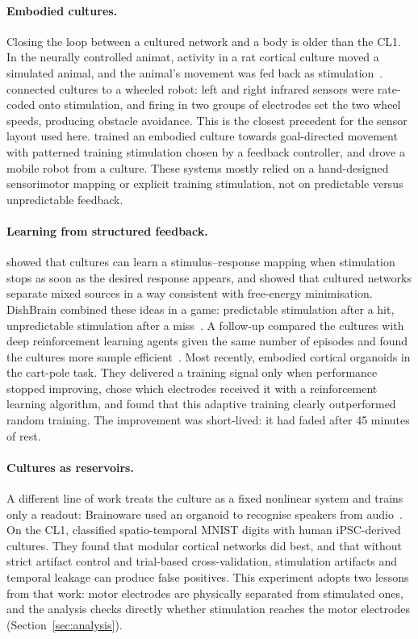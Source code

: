 \documentclass[11pt,a4paper]{article}
\begin{document}
\paragraph{Embodied cultures.} Closing the loop between a cultured network and a body is older
than the CL1. In the neurally controlled animat, activity in a rat cortical culture moved a
simulated animal, and the animal's movement was fed back as stimulation~\citep{demarse2001animat}.
\citet{novellino2007robot} connected cultures to a wheeled robot: left and right infrared sensors
were rate-coded onto stimulation, and firing in two groups of electrodes set the two wheel speeds,
producing obstacle avoidance. This is the closest precedent for the sensor layout used here.
\citet{chao2008shaping} trained an embodied culture towards goal-directed movement with
patterned training stimulation chosen by a feedback controller, and \citet{warwick2010robot} drove
a mobile robot from a culture. These systems mostly relied on a hand-designed sensorimotor
mapping or explicit training stimulation, not on predictable versus unpredictable feedback.

\paragraph{Learning from structured feedback.} \citet{shahaf2001learning} showed that cultures
can learn a stimulus--response mapping when stimulation stops as soon as the desired response
appears, and \citet{isomura2015bss} showed that cultured networks separate mixed sources in a way
consistent with free-energy minimisation. DishBrain combined these ideas in a game: predictable
stimulation after a hit, unpredictable stimulation after a miss~\citep{kagan2022dishbrain}. A
follow-up compared the cultures with deep reinforcement learning agents given the same number of
episodes and found the cultures more sample efficient~\citep{khajehnejad2024sample}. Most
recently, \citet{robbins2026organoids} embodied cortical organoids in the cart-pole task. They
delivered a training signal only when performance stopped improving, chose which electrodes
received it with a reinforcement learning algorithm, and found that this adaptive training
clearly outperformed random training. The improvement was short-lived: it had faded after
45 minutes of rest.

\paragraph{Cultures as reservoirs.} A different line of work treats the culture as a fixed
nonlinear system and trains only a readout: Brainoware used an organoid to recognise speakers
from audio~\citep{cai2023brainoware}. On the CL1, \citet{loeffler2026digits} classified
spatio-temporal MNIST digits with human iPSC-derived cultures. They found that modular cortical
networks did best, and that without strict artifact control and trial-based cross-validation,
stimulation artifacts and temporal leakage can produce false positives. This experiment adopts
two lessons from that work: motor electrodes are physically separated from stimulated ones, and
the analysis checks directly whether stimulation reaches the motor electrodes
(Section~\ref{sec:analysis}).
\end{document}
